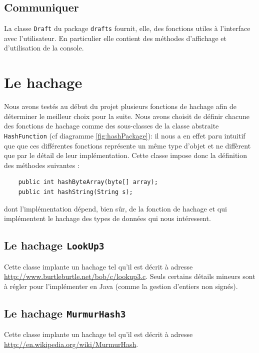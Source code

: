 \documentclass[12pt,a4paper,titlepage]{article}
\newcommand{\class}[1]{\texttt{#1}}
\begin{document}
\subsection*{Communiquer}
La classe \class{Draft} du package \class{drafts} fournit, elle, des fonctions utiles à l'interface avec l'utilisateur. En particulier elle contient des méthodes d'affichage et d'utilisation de la console.




\newpage
\section{Le hachage}


Nous avons testés au début du projet plusieurs fonctions de hachage afin de déterminer le meilleur choix pour la suite. Nous avons choisit de définir chacune des fonctions de hachage comme des sous-classes de la classe abstraite \class{HashFunction} (cf diagramme \ref{fig:hashPackage}): il nous a en effet paru intuitif que que ces différentes fonctions représente un même type d'objet et ne diffèrent que par le détail de leur implémentation. Cette classe impose donc la définition des méthodes suivantes :
\begin{lstlisting}
	public int hashByteArray(byte[] array);
	public int hashString(String s);
\end{lstlisting}
dont l'implémentation dépend, bien sûr, de la fonction de hachage et qui implémentent le hachage des types de données qui nous intéressent. 

\subsection{Le hachage \class{LookUp3}}
Cette classe implante un hachage tel qu'il est décrit à adresse \href{http://www.burtleburtle.net/bob/c/lookup3.c}{http://www.burtleburtle.net/bob/c/lookup3.c}. Seuls certains détails mineurs sont à régler pour l'implémenter en Java (comme la gestion d'entiers non signés).

\subsection{Le hachage \class{MurmurHash3}}
Cette classe implante un hachage tel qu'il est décrit à adresse \href{http://en.wikipedia.org/wiki/MurmurHash}{http://en.wikipedia.org/wiki/MurmurHash}.
\end{document}
